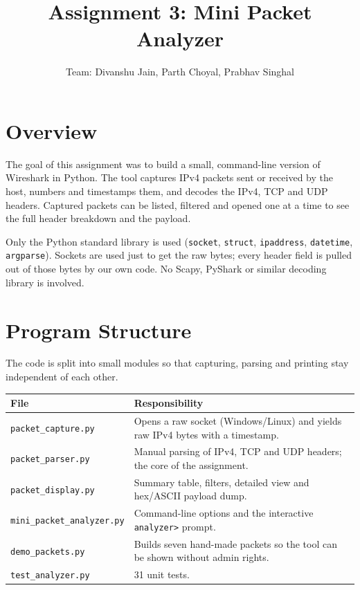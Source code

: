 \documentclass[11pt,a4paper]{article}
\title{\textbf{Assignment 3: Mini Packet Analyzer}}
\author{Team: Divanshu Jain, Parth Choyal, Prabhav Singhal}
\date{}
\begin{document}
\maketitle
\vspace{-1.5em}

\section{Overview}

The goal of this assignment was to build a small, command-line version of
Wireshark in Python. The tool captures IPv4 packets sent or received by the
host, numbers and timestamps them, and decodes the IPv4, TCP and UDP headers.
Captured packets can be listed, filtered and opened one at a time to see the
full header breakdown and the payload.

Only the Python standard library is used (\texttt{socket}, \texttt{struct},
\texttt{ipaddress}, \texttt{datetime}, \texttt{argparse}). Sockets are used
just to get the raw bytes; every header field is pulled out of those bytes by
our own code. No Scapy, PyShark or similar decoding library is involved.

\section{Program Structure}

The code is split into small modules so that capturing, parsing and printing
stay independent of each other.

\begin{center}
\begin{tabularx}{\textwidth}{@{}lX@{}}
\toprule
\textbf{File} & \textbf{Responsibility} \\
\midrule
\texttt{packet\_capture.py} & Opens a raw socket (Windows/Linux) and yields raw IPv4 bytes with a timestamp. \\
\texttt{packet\_parser.py} & Manual parsing of IPv4, TCP and UDP headers; the core of the assignment. \\
\texttt{packet\_display.py} & Summary table, filters, detailed view and hex/ASCII payload dump. \\
\texttt{mini\_packet\_analyzer.py} & Command-line options and the interactive \texttt{analyzer>} prompt. \\
\texttt{demo\_packets.py} & Builds seven hand-made packets so the tool can be shown without admin rights. \\
\texttt{test\_analyzer.py} & 31 unit tests. \\
\bottomrule
\end{tabularx}
\end{center}
\end{document}
